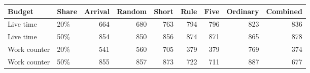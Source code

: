 \begin{tabular}{llrrrrrrr}
\toprule
Budget & Share & Arrival & Random & Short & Rule & Five & Ordinary & Combined\\
\midrule
Live time & 20\% & 664 & 680 & 763 & 794 & 796 & 823 & 836\\
Live time & 50\% & 854 & 850 & 856 & 874 & 871 & 865 & 878\\
\midrule
Work counter & 20\% & 541 & 560 & 705 & 379 & 379 & 769 & 374\\
Work counter & 50\% & 855 & 857 & 873 & 722 & 711 & 887 & 677\\
\bottomrule
\end{tabular}
